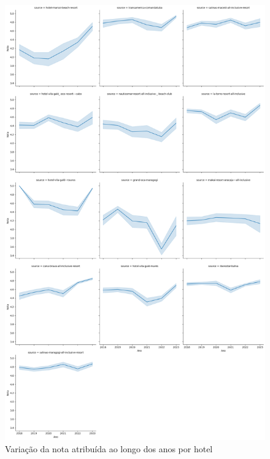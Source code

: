 \begin{figure}
	\centering
	\includegraphics[width=1\textwidth]{figs/exploratoria/relplot_ano_rating_source.png}
	\caption{Variação da nota atribuída ao longo dos anos por hotel}
	\label{img:relplot_ano_rating_source}
\end{figure}

